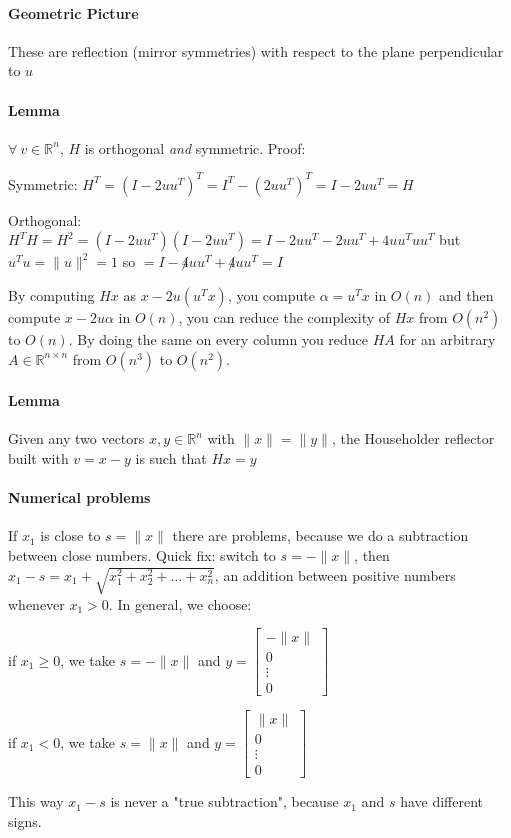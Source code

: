 \documentclass[10pt]{report}
\begin{document}
\paragraph{Geometric Picture} These are reflection (mirror symmetries) with respect to the plane perpendicular to $u$
\paragraph{Lemma}$\forall\:v\in \mathbb{R}^n$, $H$ is orthogonal \textit{and} symmetric. Proof:
\begin{list}{}{}
	\item Symmetric: $H^T = (I-2uu^T)^T = I^T - (2uu^T)^T = I - 2uu^T = H$
	\item Orthogonal: $H^TH = H^2 = (I-2uu^T)(I-2uu^T) = I - 2uu^T - 2uu^T + 4uu^Tuu^T$ but $u^Tu = \|u\|^2 = 1$ so $= I - \not 4uu^T + \not 4uu^T = I$
\end{list}
By computing $Hx$ as $x - 2u(u^T x)$, you compute $\alpha = u^Tx$ in $O(n)$ and then compute $x-2u\alpha$ in $O(n)$, you can reduce the complexity of $Hx$ from $O(n^2)$ to $O(n)$. By doing the same on every column you reduce $HA$ for an arbitrary $A\in \mathbb{R}^{n\times n}$ from $O(n^3)$ to $O(n^2)$.
\paragraph{Lemma} Given any two vectors $x,y\in \mathbb{R}^n$ with $\|x\| = \|y\|$, the Householder reflector built with $v = x-y$ is such that $Hx = y$
\paragraph{Numerical problems} If $x_1$ is close to $s = \|x\|$ there are problems, because we do a subtraction between close numbers. Quick fix: switch to $s = -\|x\|$, then $x_1 - s = x_1 + \sqrt{x_1^2+x_2^2+\ldots+x_n^2}$, an addition between positive numbers whenever $x_1 > 0$. In general, we choose:
\begin{list}{}{}
	\item if $x_1 \geq 0$, we take $s = -\|x\|$ and $y = \left[\begin{array}{c}
	-\|x\|\\0\\\vdots\\0
	\end{array}\right]$
	\item if $x_1 < 0$, we take $s = \|x\|$ and $y = \left[\begin{array}{c}
	\|x\|\\0\\\vdots\\0
	\end{array}\right]$
\end{list}
This way $x_1 - s$ is never a "true subtraction", because $x_1$ and $s$ have different signs.
\end{document}
